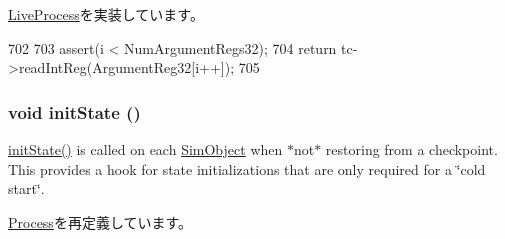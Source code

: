 \hyperlink{classLiveProcess_aa001ff57ec460026facb89ba19c7bf96}{LiveProcess}を実装しています。


\begin{DoxyCode}
702 {
703     assert(i < NumArgumentRegs32);
704     return tc->readIntReg(ArgumentReg32[i++]);
705 }
\end{DoxyCode}
\hypertarget{classX86ISA_1_1I386LiveProcess_a3c34ea9b29f410748d4435a667484924}{
\subsubsection[{initState}]{\setlength{\rightskip}{0pt plus 5cm}void initState ()}}
\label{classX86ISA_1_1I386LiveProcess_a3c34ea9b29f410748d4435a667484924}
\hyperlink{classX86ISA_1_1I386LiveProcess_a3c34ea9b29f410748d4435a667484924}{initState()} is called on each \hyperlink{classSimObject}{SimObject} when $\ast$not$\ast$ restoring from a checkpoint. This provides a hook for state initializations that are only required for a \char`\"{}cold start\char`\"{}. 

\hyperlink{classProcess_a3c34ea9b29f410748d4435a667484924}{Process}を再定義しています。


